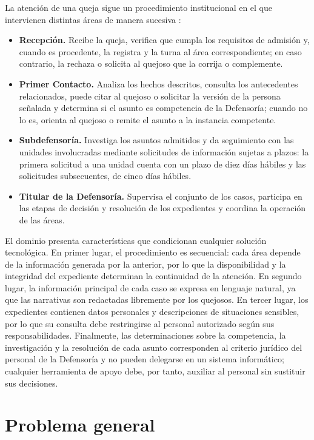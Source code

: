 	La atención de una queja sigue un procedimiento institucional en el que intervienen distintas áreas de manera sucesiva \cite{ipn_manual_procedimientos_ddp}:

	\begin{itemize}
		\item \textbf{Recepción.} Recibe la queja, verifica que cumpla los requisitos de admisión y, cuando es procedente, la registra y la turna al área correspondiente; en caso contrario, la rechaza o solicita al quejoso que la corrija o complemente.
		\item \textbf{Primer Contacto.} Analiza los hechos descritos, consulta los antecedentes relacionados, puede citar al quejoso o solicitar la versión de la persona señalada y determina si el asunto es competencia de la Defensoría; cuando no lo es, orienta al quejoso o remite el asunto a la instancia competente.
		\item \textbf{Subdefensoría.} Investiga los asuntos admitidos y da seguimiento con las unidades involucradas mediante solicitudes de información sujetas a plazos: la primera solicitud a una unidad cuenta con un plazo de diez días hábiles y las solicitudes subsecuentes, de cinco días hábiles.
		\item \textbf{Titular de la Defensoría.} Supervisa el conjunto de los casos, participa en las etapas de decisión y resolución de los expedientes y coordina la operación de las áreas.
	\end{itemize}

	El dominio presenta características que condicionan cualquier solución tecnológica. En primer lugar, el procedimiento es secuencial: cada área depende de la información generada por la anterior, por lo que la disponibilidad y la integridad del expediente determinan la continuidad de la atención. En segundo lugar, la información principal de cada caso se expresa en lenguaje natural, ya que las narrativas son redactadas libremente por los quejosos. En tercer lugar, los expedientes contienen datos personales y descripciones de situaciones sensibles, por lo que su consulta debe restringirse al personal autorizado según sus responsabilidades. Finalmente, las determinaciones sobre la competencia, la investigación y la resolución de cada asunto corresponden al criterio jurídico del personal de la Defensoría y no pueden delegarse en un sistema informático; cualquier herramienta de apoyo debe, por tanto, auxiliar al personal sin sustituir sus decisiones.

	\section{Problema general}

